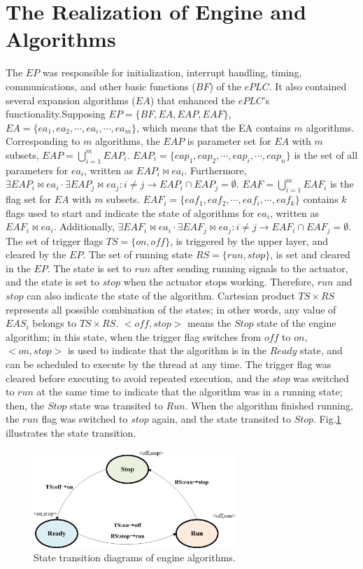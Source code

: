 \documentclass[journal]{IEEEtran}
\begin{document}
\section{The Realization of Engine and Algorithms}
\label{Engine-Algorithms1}
The $EP$ was responsible for initialization, interrupt handling, timing, communications, and other basic functions ($BF$) of the $ePLC$. It also contained several expansion algorithms ($EA$) that enhanced the $ePLC$'s functionality.Supposing $EP=\{BF,EA,EAP,EAF\}$, $EA=\{ea_1,ea_2,\cdots,ea_i, \cdots , ea_m\}$, which means that the EA contains $m$ algorithms. Corresponding to $m$ algorithms, the $EAP$ is parameter set for $EA$ with $m$ subsets, $EAP=\bigcup_{i=1}^mEAP_i$. $EAP_i=\{eap_1,eap_2,\cdots, eap_i, \cdots , eap_n\}$ is the set of all parameters for $ea_i$, written as
$EAP_i \bowtie ea_i$. Furthermore, $\exists EAP_i \bowtie ea_i \cdot \exists EAP_j \bowtie ea_j : i\neq j \rightarrow EAP_i\cap EAP_j=\emptyset$. $EAF=\bigcup_{i=1}^mEAF_i$ is the flag set for $EA$ with $m$ subsets. $EAF_i= \{eaf_1, eaf_2, \cdots,eaf_i, \cdots, eaf_k\}$ contains $k$ flags used to start and indicate the state of algorithms for $ea_i$, written as $EAF_i\bowtie ea_i$. Additionally, $\exists EAF_i\bowtie ea_i  \cdot \exists EAF_j \bowtie ea_j:i\neq j \rightarrow EAF_i \cap EAF_j=\emptyset$.
The set of trigger flags $TS=\{on,off\}$, is triggered by the upper layer, and cleared by the $EP$. The set of running state $RS = \{run,stop\}$, is set and cleared in the $EP$. The state is set to $run$ after sending running signals to the actuator, and the state is set to $stop$ when the actuator stops working. Therefore, $run$ and $stop$ can also indicate the state of the algorithm. Cartesian product $TS\times RS$ represents all possible combination of the states; in other words, any value of $EAS_i$  belongs to $TS \times RS$.
$<off,stop>$ means the $Stop$ state of the engine algorithm; in this state, when the trigger flag switches from $off$ to $on$, $<on,stop>$ is used to indicate that the algorithm is in the $Ready$ state, and can be scheduled to execute by the thread at any time. The trigger flag was cleared before executing to avoid repeated execution, and the $stop$ was switched to $run$ at the same time to indicate that the algorithm was in a running state; then, the $Stop$ state was transited to $Run$. When the algorithm finished running, the $run$ flag was switched to $stop$ again, and the state transited to $Stop$. Fig.\ref{fig:statetransition} illustrates the state transition.

\begin{figure}
\centering
\includegraphics[width=3in]{fig/FIG7_TII-18-0024.eps}
\caption{State transition diagrams of engine algorithms.}
\label{fig:statetransition}
\end{figure}
\end{document}
